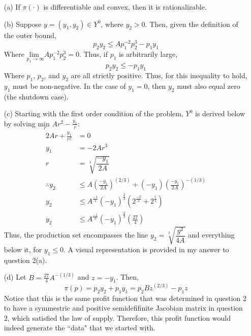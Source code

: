 \documentclass{article}
\begin{document}
\begin{itemize}
	\item[(a)] If $\pi(\cdot)$ is differentiable and convex, then it is rationalizable.
	
	\item[(b)] Suppose $y=(y_1,y_2)\in Y^0$, where $y_2>0$. Then, given the definition of the outer bound,
		\[
			p_2y_2 \leq Ap_1^{-2}p_2^3 - p_1y_1
		\]
		Where $\underset{p_1\rightarrow\infty}{\text{lim }}Ap_1^{-2}p_2^3=0$. Thus, if $p_1$ is arbitrarily large, 
		\[
			p_2y_2 \leq - p_1y_1
		\]
		Where $p_1$, $p_2$, and $y_2$ are all strictly positive. Thus, for this inequality to hold, $y_1$ must be non-negative. In the case of $y_1=0$, then $y_2$ must also equal zero (the shutdown case).
	
	\item[(c)] Starting with the first order condition of the problem, $Y^0$ is derived below by solving $\underset{r}{\text{min }}Ar^2-\frac{y_1}{r}$:
		\begin{align*}
			2Ar + \frac{y_1}{r^2} &= 0		\\
			y_1 &= -2Ar^3					\\
			r &= \sqrt[3]{\dfrac{-y_1}{2A}}	\\
			\therefore 	y_2 &\leq A\left(\frac{-y_1}{2A}\right)^{(2/3)} +(-y_1)\left(\frac{-y_1}{2A}\right)^{-(1/3)} 	\\
						y_2 &\leq A^{\frac{-1}{3}}(-y_1)^{\frac{2}{3}}\left(2^{\frac{-2}{3}}+2^\frac{1}{3}\right)		\\
						y_2 &\leq A^{\frac{-1}{3}}(-y_1)^{\frac{2}{3}}\left(\frac{27}{4}\right)
		\end{align*}
		Thus, the production set encompasses the line $y_2=\sqrt[3]{\dfrac{y^2}{4A}}$ and everything below it, for $y_1\leq0$. A visual representation is provided in my answer to question 2(a).
		
	\item[(d)] Let $B=\frac{27}{4}A^{-(1/3)}$ and $z = -y_1$. Then, 
		\[
			\pi(p) = p_2y_2 + p_1y_1 = p_2Bz^{(2/3)} - p_1z
		\]
		Notice that this is the same profit function that was determined in question 2 to have a symmestric and positive semidefifinite Jacobian matrix in question 2, which satisfied the law of supply. Therefore, this profit function would indeed generate the ``data" that we started with.
	
\end{itemize}



\end{document}
